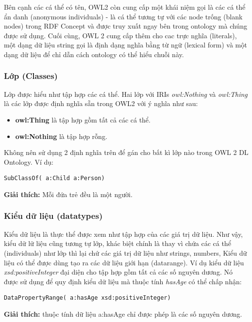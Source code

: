 Bên cạnh các cá thể có tên, OWL2 còn cung cấp một khái niệm gọi là các cá thể ẩn danh (anonymous individuals) - là cá thể tương tự với các node trống (blank nodes) trong RDF Concept \cite{rdf_concept} và được truy xuất ngay bên trong ontology mà chúng được sử dụng. Cuối cùng, OWL 2 cung cấp thêm cho cac trực nghĩa (literals), một dạng dữ liệu string gọi là định dạng nghĩa bằng từ ngữ (lexical form) và một dạng dữ liệu để chỉ dẫn cách ontology có thể hiểu chuỗi này.
\subsubsection{Lớp (Classes)}
Lớp được hiểu như tập hợp các cá thể. Hai lớp với IRIs \textit{owl:Nothing} và \textit{owl:Thing} là các lớp được định nghĩa sẵn trong OWL2 với ý nghĩa như sau:
\begin{itemize}
\item \textbf{owl:Thing} là tập hợp gồm tất cả các cá thể.
\item \textbf{owl:Nothing} là tập hợp rỗng.
\end{itemize}
Không nên sử dụng 2 định nghĩa trên để gán cho bất kì lớp nào trong OWL 2 DL Ontology. Ví dụ:
\begin{verbatim}
SubClassOf( a:Child a:Person) 
\end{verbatim}
\textbf{Giải thích:} Mỗi đứa trẻ đều là một người.

\subsubsection{Kiểu dữ liệu (datatypes)}
Kiểu dữ liệu là thực thể được xem như tập hợp của các giá trị dữ liệu. Như vậy, kiểu dữ lữ liệu cũng tương tự lớp, khác biệt chính là thay vì chứa các cá thể (individuals) như lớp thì lại chứ các giá trị dữ liệu như strings, numbers, Kiểu dữ liệu có thể được dùng tạo ra các dữ liệu giới hạn (datarange). Ví dụ kiểu dữ liệu \textit{xsd:positiveInteger} đại diện cho tập hợp gồm tất cả các số nguyên dương. Nó được sử dụng để quy định kiểu dữ liệu mà thuộc tính \textit{hasAge} có thể chấp nhận:

\begin{verbatim}
DataPropertyRange( a:hasAge xsd:positiveInteger) 
\end{verbatim}

\textbf{Giải thích:} thuộc tính dữ liệu a:hasAge chỉ được phép là các số nguyên dương.

